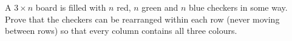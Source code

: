 A $3\times n$ board is filled with $n$ red, $n$ green and $n$ blue checkers in some way. Prove that the checkers can be rearranged within each row (never moving between rows) so that every column contains all three colours.
